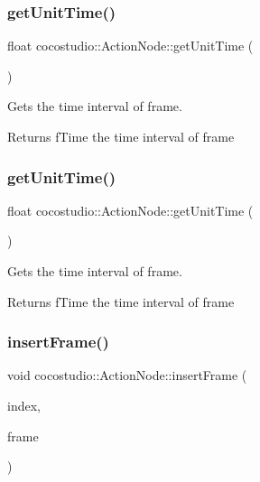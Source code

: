 \subsubsection{\texorpdfstring{get\+Unit\+Time()}{getUnitTime()}\hspace{0.1cm}{\footnotesize\ttfamily [1/2]}}
{\footnotesize\ttfamily float cocostudio\+::\+Action\+Node\+::get\+Unit\+Time (\begin{DoxyParamCaption}{ }\end{DoxyParamCaption})}

Gets the time interval of frame.

\begin{DoxyReturn}{Returns}
f\+Time the time interval of frame 
\end{DoxyReturn}
\mbox{\label{classcocostudio_1_1ActionNode_a26e826ff6e9e705b81fe59a25a938367}} 
\subsubsection{\texorpdfstring{get\+Unit\+Time()}{getUnitTime()}\hspace{0.1cm}{\footnotesize\ttfamily [2/2]}}
{\footnotesize\ttfamily float cocostudio\+::\+Action\+Node\+::get\+Unit\+Time (\begin{DoxyParamCaption}{ }\end{DoxyParamCaption})}

Gets the time interval of frame.

\begin{DoxyReturn}{Returns}
f\+Time the time interval of frame 
\end{DoxyReturn}
\mbox{\label{classcocostudio_1_1ActionNode_a878d16c3aee4203fddf6891f90f9bc8d}} 
\subsubsection{\texorpdfstring{insert\+Frame()}{insertFrame()}\hspace{0.1cm}{\footnotesize\ttfamily [1/2]}}
{\footnotesize\ttfamily void cocostudio\+::\+Action\+Node\+::insert\+Frame (\begin{DoxyParamCaption}\item[{int}]{index,  }\item[{\hyperlink{classcocostudio_1_1ActionFrame}{Action\+Frame} $\ast$}]{frame }\end{DoxyParamCaption})}

